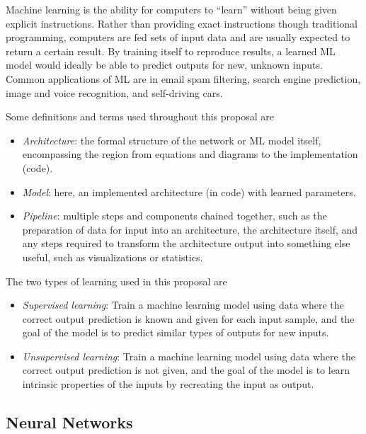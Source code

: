 \documentclass[12pt]{article}
\begin{document}
Machine learning is the ability for computers to ``learn'' without being given explicit instructions. Rather than providing exact instructions though traditional programming, computers are fed sets of input data and are usually expected to return a certain result. By training itself to reproduce results, a learned ML model would ideally be able to predict outputs for new, unknown inputs. Common applications of ML are in email spam filtering, search engine prediction, image and voice recognition, and self-driving cars.

Some definitions and terms used throughout this proposal are

\begin{itemize}
\item \emph{Architecture}: the formal structure of the network or ML model itself, encompassing the region from equations and diagrams to the implementation (code).
\item \emph{Model}: here, an implemented architecture (in code) with learned parameters.
\item \emph{Pipeline}: multiple steps and components chained together, such as the preparation of data for input into an architecture, the architecture itself, and any steps required to transform the architecture output into something else useful, such as visualizations or statistics.
\end{itemize}

The two types of learning used in this proposal are

\begin{itemize}
\item \emph{Supervised learning}: Train a machine learning model using data where the correct output prediction is known and given for each input sample, and the goal of the model is to predict similar types of outputs for new inputs.
\item \emph{Unsupervised learning}: Train a machine learning model using data where the correct output prediction is not given, and the goal of the model is to learn intrinsic properties of the inputs by recreating the input as output.
\end{itemize}

\subsection{Neural Networks}
\label{sec:orged67b82}
\end{document}
